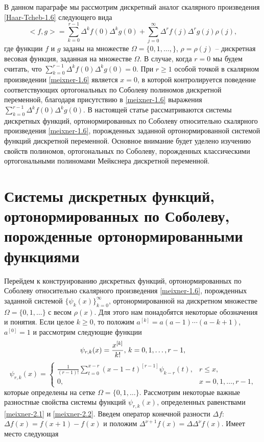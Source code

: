 В данном параграфе мы рассмотрим дискретный аналог скалярного произведения \eqref{Haar-Tcheb-1.6}  следующего вида
\begin{equation}\label{meixner-1.6}
   <f,g>=\sum_{k=0}^{r-1}\Delta^kf(0)\Delta^kg(0)+
      \sum_{j=0}^\infty\Delta^rf(j)\Delta^rg(j)\rho(j),
\end{equation}
 где функции $f$ и $g$ заданы на  множестве $\Omega=\{0,1,\ldots,\}$, $\rho=\rho(j)$ -- дискретная весовая функция, заданная на множестве $\Omega$. В случае, когда $r=0$ мы будем считать, что $\sum_{k=0}^{r-1}\Delta^kf(0)\Delta^kg(0)=0$. При $r\ge1$ особой точкой в скалярном произведении \eqref{meixner-1.6} является  $x=0$, в которой контролируется поведение соответствующих ортогональных по Соболеву полиномов дискретной переменной, благодаря присутствию в  \eqref{meixner-1.6} выражения  $\sum_{k=0}^{r-1}\Delta^kf(0)\Delta^kg(0)$. В настоящей статье рассматриваются системы дискретных функций, ортонормированных по Соболеву относительно скалярного произведения \eqref{meixner-1.6}, порожденных заданной ортонормированной системой функций дискретной переменной. Основное внимание будет уделено изучению свойств полиномов, ортогональных по Соболеву, порожденных классическими  ортогональными полиномами Мейкснера  дискретной переменной.

\section{Системы дискретных функций, ортонормированных по Соболеву, порожденные  ортонормированными  функциями}\label{sobolev-common}

Перейдем к конструированию дискретных функций, ортонормированных по Соболеву относительно скалярного произведения \eqref{meixner-1.6}, порожденных заданной системой $\{\psi_k(x)\}_{k=0}^\infty$, ортонормированной на дискретном множестве $\Omega=\{0,1,\ldots\}$ с весом $\rho(x)$. Для этого нам понадобятся некоторые обозначения и понятия. Если целое $k\ge0$, то положим $a^{[k]}=a(a-1)\cdots (a-k+1)$, $a^{[0]}=1$ и рассмотрим следующие функции
\begin{equation}\label{meixner-2.1}
\psi_{r,k}(x)={x^{[k]}\over k!},\, k=0,1,\ldots,r-1,
\end{equation}
\begin{equation}\label{meixner-2.2}
\psi_{r,k}(x)=\begin{cases}\frac{1}{(r-1)!}\sum\limits_{t=0}^{x-r}(x-1-t)^{[r-1]}\psi_{k-r}(t),
&\text{$r\le x$,}\\ 0,&\text{$x=0,1,\ldots, r-1$,}
\end{cases}
\end{equation}
которые определены на сетке $\Omega=\{0,1,\ldots\}$. Рассмотрим некоторые важные разностные  свойства системы функций $\psi_{r,k}(x)$, определенных равенствами \eqref{meixner-2.1} и \eqref{meixner-2.2}. Введем оператор  конечной разности $\Delta f$: $\Delta f(x)=f(x+1)-f(x)$ и положим $\Delta^{\nu+1} f(x)=\Delta\Delta^\nu f(x)$. Имеет место следующая

